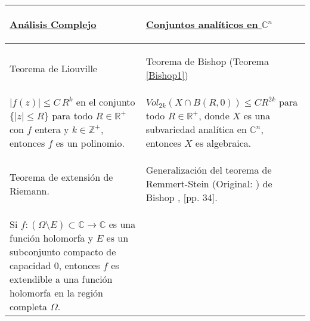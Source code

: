 \documentclass[letterpaper]{report}
\newcommand{\zah}{\ensuremath{ \mathbb Z }}
\newcommand{\co}{\ensuremath{\mathbb C }}
\newcommand{\con}{\ensuremath{\mathbb{C}^n}}
\newcommand{\re}{\ensuremath{\mathbb R }}
\begin{document}
        \begin{tabular}{| m{5.5cm} | m{5.5cm} |} \hline
                        \begin{center} \vspace*{0.2cm} 
                                \underline{\textbf{An\'alisis Complejo}} 
                        \end{center} & 
                        \begin{center} \vspace*{0.2cm}
                                \underline{\textbf{Conjuntos anal\'iticos en $\con$}}
                        \end{center} \\
                \hline
                \begin{center} 
                        Teorema de Liouville 
                \end{center} & 
                \begin{center}
                        Teorema de Bishop (Teorema \ref{Bishop1})
                \end{center}\\ 
                        \hline $\vert f(z)\vert\leq C\,R^k$ en el conjunto $\{\vert z\vert\leq R\}$ 
                        para todo $R\in\re^{+}$con $f$ entera y $k\in\zah^{+}$, entonces 
                        $f$ es un polinomio. 
                        &
                        \vspace{0.1cm}
                        $Vol_{2k}(X\cap B(R,0))\leq CR^{2k}$ para todo
                        $R\in\re^{+}$, donde $X$ es una subvariedad anal\'itica en $\con$, entonces $X$ es algebraica.\\ 
                        \hline
                        \vspace{0.1cm}
                        \begin{center} 
                        Teorema de extensi\'on de Riemann. 
                \end{center} 
                        & 
                \begin{center} 
                        Generalizaci\'on del teorema de Remmert-Stein (Original: \cite{R-S}) de Bishop \cite{Bishop}, \cite{Stolzenberg}[pp. 34]. 
                \end{center} \\ 
                        \hline Si $f:(\Omega\setminus E)\subset\co\rightarrow\co$ es una funci\'on holomorfa y $E$ es un subconjunto
                        compacto de capacidad $0$, entonces $f$ es extendible a una funci\'on holomorfa
                        en la regi\'on completa $\Omega$.  
                        &


\end{tabular}
\end{document}

